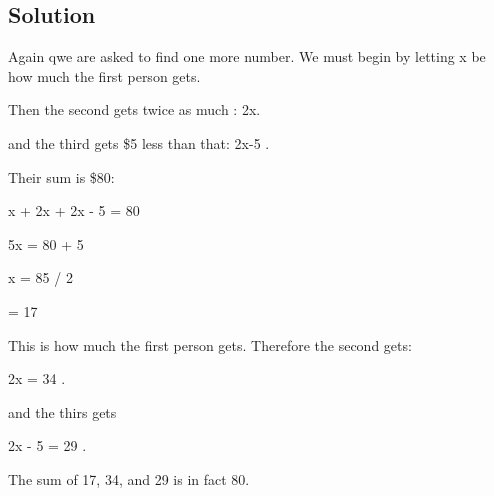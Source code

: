 \documentclass[12pt]{article}%
\begin{document}
\subsection{Solution}

Again qwe are asked to find one more number. We must begin by letting x be how much the first person gets.

Then the second gets twice as much : 2x. 

and the third gets \$5 less than that: 2x-5 .

Their sum is \$80: 

x + 2x + 2x - 5 = 80 

5x = 80 + 5

x = 85 / 2 

= 17 

This is how much the first person gets. Therefore the second gets: 

2x = 34 . 

and the thirs gets 

2x - 5 = 29 . 

The sum of 17, 34, and 29 is in fact 80. 


       
                       
                       
  
  
  
  
  
  
  
  
  
  
\end{document}
